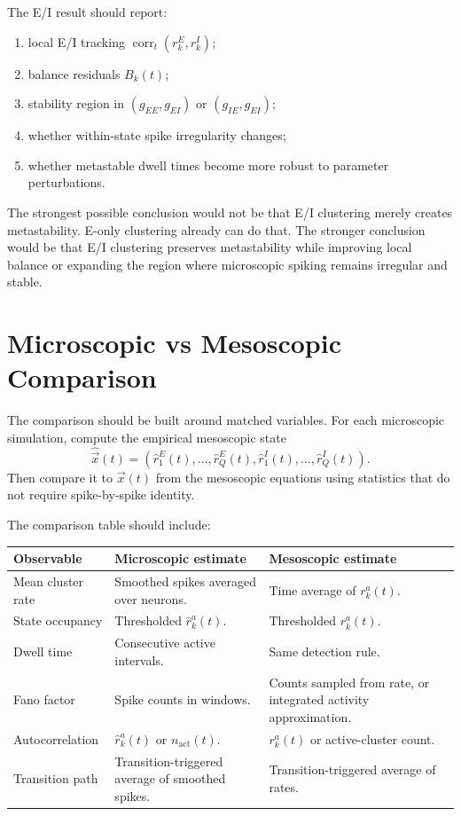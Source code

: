 The E/I result should report:
%
\begin{enumerate}[leftmargin=*]
  \item local E/I tracking $\operatorname{corr}_t(r_k^E,r_k^I)$;
  \item balance residuals $B_k(t)$;
  \item stability region in $(g_{EE},g_{EI})$ or $(g_{IE},g_{EI})$;
  \item whether within-state spike irregularity changes;
  \item whether metastable dwell times become more robust to parameter perturbations.
\end{enumerate}

The strongest possible conclusion would not be that E/I clustering merely creates metastability. E-only clustering already can do that. The stronger conclusion would be that E/I clustering preserves metastability while improving local balance or expanding the region where microscopic spiking remains irregular and stable.

\section{Microscopic vs Mesoscopic Comparison}
\label{sec:microscopic-vs-mesoscopic-comparison-artifact}

The comparison should be built around matched variables. For each microscopic simulation, compute the empirical mesoscopic state
%
\begin{equation}
  \widehat{\vec x}(t)
  =
  \left(
    \widehat r_1^E(t),\ldots,\widehat r_Q^E(t),
    \widehat r_1^I(t),\ldots,\widehat r_Q^I(t)
  \right).
  \label{eq:empirical-mesoscopic-state-vector}
\end{equation}
%
Then compare it to $\vec x(t)$ from the mesoscopic equations using statistics that do not require spike-by-spike identity.

The comparison table should include:
%
\begin{longtable}{@{}p{}p{}p{}@{}}
\toprule
\textbf{Observable} & \textbf{Microscopic estimate} & \textbf{Mesoscopic estimate} \\
\midrule
Mean cluster rate & Smoothed spikes averaged over neurons. & Time average of $r_k^a(t)$. \\
State occupancy & Thresholded $\widehat r_k^a(t)$. & Thresholded $r_k^a(t)$. \\
Dwell time & Consecutive active intervals. & Same detection rule. \\
Fano factor & Spike counts in windows. & Counts sampled from rate, or integrated activity approximation. \\
Autocorrelation & $\widehat r_k^a(t)$ or $n_{\mathrm{act}}(t)$. & $r_k^a(t)$ or active-cluster count. \\
Transition path & Transition-triggered average of smoothed spikes. & Transition-triggered average of rates. \\
\bottomrule
\end{longtable}

